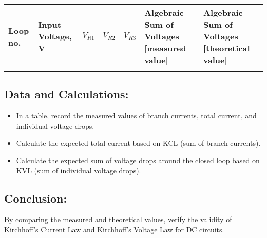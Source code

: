 \begin{table}[h]
    \centering
    \begin{tabular}{m{1.5 cm}|m{1.5 cm}|m{1.25 cm}|m{1.25 cm}|m{1.25 cm}|m{3 cm}|m{3 cm}}
        \hline
        Loop no. & Input Voltage, V & $V_{R1}$ & $V_{R2}$ & $V_{R3}$ & Algebraic Sum of Voltages [measured value] & Algebraic Sum of Voltages [theoretical value] \\
        \hline
         &   &  &  &  & \\
        \hline

    \end{tabular}
    \label{tab:kvl}
\end{table}

\subsection*{Data and Calculations:}

\begin{itemize}
    \item In a table, record the measured values of branch currents, total current, and individual voltage drops.
    \item Calculate the expected total current based on KCL (sum of branch currents).
    \item Calculate the expected sum of voltage drops around the closed loop based on KVL (sum of individual voltage drops).
\end{itemize}

\subsection*{Conclusion:}
By comparing the measured and theoretical values, verify the validity of Kirchhoff's Current Law and Kirchhoff's Voltage Law for DC circuits.

\newpage 
